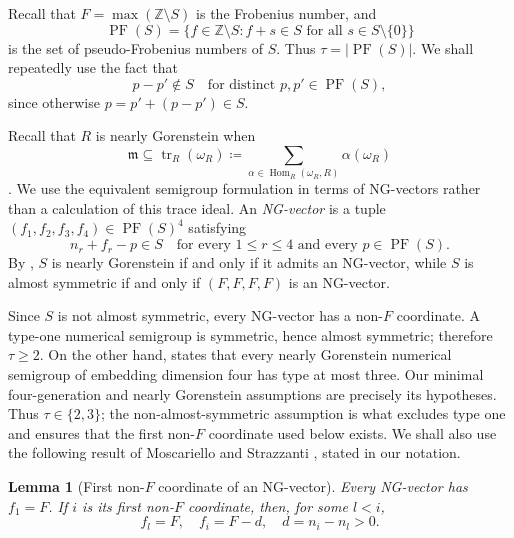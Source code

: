 \documentclass[10pt]{amsart}
\theoremstyle{plain}
\newtheorem{lemma}{Lemma}[section]
\begin{document}
Recall that \(F=\max(\mathbb Z\setminus S)\) is the Frobenius number, and
\begin{equation}\label{eq:PF-definition}
\operatorname{PF}(S)=
\{f\in\mathbb Z\setminus S:
  f+s\in S\text{ for all }s\in S\setminus\{0\}\}
\end{equation}
is the set of pseudo-Frobenius numbers of \(S\).  Thus
\(\tau=|\operatorname{PF}(S)|\).  We shall repeatedly use the fact that
\begin{equation}\label{eq:PF-difference}
p-p'\notin S
\quad
\text{for distinct }p,p'\in\operatorname{PF}(S),
\end{equation}
since otherwise \(p=p'+(p-p')\in S\).

Recall that \(R\) is nearly Gorenstein when
\[
\mathfrak m\subseteq\operatorname{tr}_R(\omega_R)
\coloneqq\sum_{\alpha\in\operatorname{Hom}_R(\omega_R,R)}\alpha(\omega_R)
\]
\cite{HHS19}.  We use the equivalent semigroup formulation in terms of
NG-vectors rather than a calculation of this trace ideal.
An \emph{NG-vector} is a tuple
\((f_1,f_2,f_3,f_4)\in\operatorname{PF}(S)^4\) satisfying
\begin{equation}\label{eq:NG-condition}
n_r+f_r-p\in S
\quad
\text{for every }1\le r\le4
\text{ and every }p\in\operatorname{PF}(S).
\end{equation}
By \cite[Definition~1.2 and Proposition~1.1]{MS21}, \(S\) is nearly
Gorenstein if and only if it admits an NG-vector, while \(S\) is almost
symmetric if and only if \((F,F,F,F)\) is an NG-vector.

Since \(S\) is not almost symmetric, every NG-vector has a non-\(F\)
coordinate.  A type-one numerical semigroup is symmetric, hence almost
symmetric; therefore \(\tau\ge2\).  On the other hand,
\cite[Theorem~2.4]{MS21} states that every nearly Gorenstein numerical
semigroup of embedding dimension four has type at most three.  Our
minimal four-generation and nearly Gorenstein assumptions are precisely
its hypotheses.  Thus \(\tau\in\{2,3\}\); the non-almost-symmetric
assumption is what excludes type one and ensures that the first
non-\(F\) coordinate used below exists.  We shall also use the following result of Moscariello and Strazzanti
\cite[Proposition~1.3]{MS21}, stated in our notation.

\begin{lemma}[First non-\(F\) coordinate of an NG-vector]\label{lem:MS-normal}
Every NG-vector has \(f_1=F\).  If \(i\) is its first non-\(F\)
coordinate, then, for some \(l<i\),
\begin{equation*}
f_l=F,\quad f_i=F-d,\quad d=n_i-n_l>0.
\end{equation*}
\end{lemma}
\end{document}
